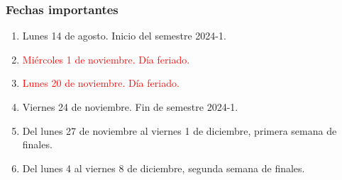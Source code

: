 \documentclass[12pt]{beamer}
\begin{document}
\begin{frame}
\frametitle{Fechas importantes}
\begin{enumerate}[<+->]
\item Lunes 14 de agosto. Inicio del semestre 2024-1.
\item \textcolor{red}{Miércoles 1 de noviembre. Día feriado.}
\item \textcolor{red}{Lunes 20 de noviembre. Día feriado.}
\item Viernes 24 de noviembre. Fin de semestre 2024-1.
\item Del lunes 27 de noviembre al viernes 1 de diciembre, primera semana de finales.
\item Del lunes 4 al viernes 8 de diciembre, segunda semana de finales.
\end{enumerate}
\end{frame}
\end{document}
